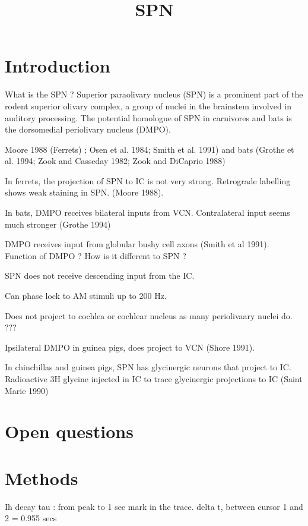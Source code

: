\documentclass{article}
\begin{document}
\title{SPN}
\maketitle

\section{Introduction}

What is the SPN ?
Superior paraolivary nucleus (SPN) is  a prominent part of the rodent superior olivary complex, a group of nuclei in the brainstem involved in auditory processing. The potential homologue of SPN in carnivores and bats is the dorsomedial periolivary nucleus (DMPO).



Moore 1988 (Ferrets) ; Osen et al. 1984; Smith et al. 1991) and bats (Grothe et al. 1994; Zook and Casseday 1982; Zook and DiCaprio 1988)

In ferrets, the projection of SPN to IC is not very strong. Retrograde labelling shows weak staining in SPN. (Moore 1988).

In bats, DMPO receives bilateral inputs from VCN. Contralateral input seems much stronger (Grothe 1994)

DMPO receives input from globular bushy cell axons (Smith et al 1991). Function of DMPO ? How is it different to SPN ?


SPN does not receive descending input from the IC.

Can phase lock to AM stimuli up to 200 Hz. 

Does not project to cochlea or cochlear nucleus as many periolivaary nuclei  do. ???

Ipsilateral DMPO in guinea pigs, does project to VCN (Shore 1991).





In chinchillas and guinea pigs, SPN has glycinergic neurons that project to IC. Radioactive 3H glycine injected in IC to trace glycinergic projections to IC (Saint Marie 1990)




\section{Open questions}


\section{Methods}

Ih decay tau : from peak to 1 sec mark in the trace. delta t, between cursor 1 and 2 = 0.955 secs
\end{document}
